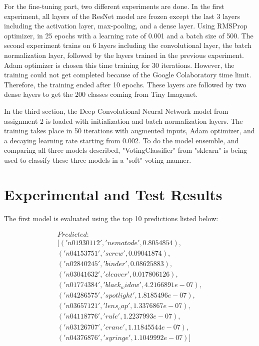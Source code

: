 \documentclass[12pt,oneside,geqno]{article}
\begin{document}
	For the fine-tuning part, two different experiments are done. In the first experiment, all layers of the ResNet model are frozen except the last 3 layers including the activation layer, max-pooling, and a dense layer. Using RMSProp optimizer, in 25 epochs with a learning rate of 0.001 and a batch size of 500. The second experiment trains on 6 layers including the convolutional layer, the batch normalization layer, followed by the layers trained in the previous experiment. Adam optimizer is chosen this time training for 30 iterations. However, the training could not get completed because of the Google Colaboratory time limit. Therefore, the training ended after 10 epochs. These layers are followed by two dense layers to get the 200 classes coming from Tiny Imagenet. 
	
	In the third section, the Deep Convolutional Neural Network model from assignment 2 is loaded with initialization and batch normalization layers. The training takes place in 50 iterations with augmented inputs, Adam optimizer, and a decaying learning rate starting from 0.002. To do the model ensemble, and comparing all three models described, "VotingClassifier" from "sklearn" is being used to classify these three models in a "soft" voting manner. 
	\pagebreak
	
	\section{Experimental and Test Results}
	
	The first model is evaluated using the top 10 predictions listed below:
	
	\begin{multline}
		Predicted: \\
		[('n01930112', 'nematode', 0.8054854), \\
		('n04153751', 'screw', 0.09041874), \\
		('n02840245', 'binder', 0.08625883), \\
		('n03041632', 'cleaver', 0.017806126), \\
		('n01774384', 'black_widow', 4.2166891e-07), \\
		('n04286575', 'spotlight', 1.8185496e-07), \\
		('n03657121', 'lens_cap', 1.3376867e-07), \\
		('n04118776', 'rule', 1.2237993e-07), \\
		('n03126707', 'crane', 1.11845544e-07), \\
		('n04376876', 'syringe', 1.1049992e-07)] \\			
	\end{multline}
	
\end{document}
